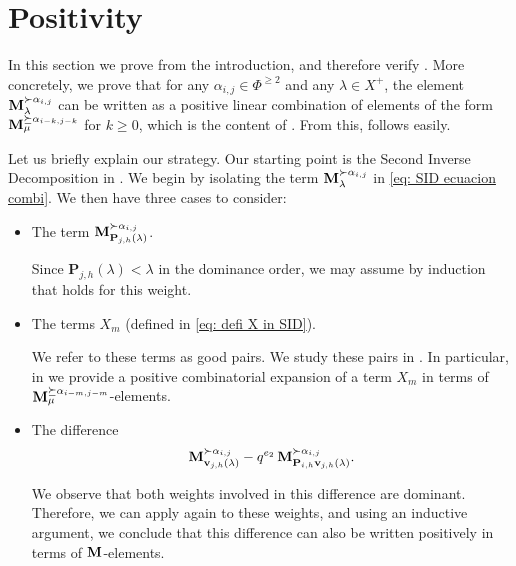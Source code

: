 
\section{Positivity}\label{section: positivity}

In this section we prove  from the introduction, and therefore verify .
More concretely, we prove that for any $\alpha_{i,j}\in \Phi^{\geq 2}$ and any $\lambda \in X^+$, the element $\mathbf{M}_{\lambda }^{\succ \alpha_{i,j}}$ can be written as a positive linear combination of elements of the form $\mathbf{M}_{\mu}^{\succeq \alpha_{i-k,j-k}}$ for $k\geq 0$, which is the content of .
From this,  follows easily.

Let us briefly explain our strategy.
Our starting point is the Second Inverse Decomposition in .
We begin by isolating the term $\mathbf{M}_{\lambda}^{\succ \alpha_{i,j}}$ in \eqref{eq: SID ecuacion combi}.
We then have three cases to consider:
\begin{itemize}
\item The term $\mathbf{M}_{\mathbf{P}_{j,h}(\lambda)}^{\succ \alpha_{i,j}}$.

Since $\mathbf{P}_{j,h}(\lambda)< \lambda$ in the dominance order, we may assume by induction that  holds for this weight.

\item The terms $X_m$ (defined in \eqref{eq: defi X in SID}). 

We refer to these terms as good pairs. 
We study these pairs in .
In particular, in  we provide a positive combinatorial expansion of a term $X_m$ in terms of $\mathbf{M}_{\mu}^{\succeq \alpha_{i-m,j-m}}$-elements. 

\item The difference
\[
\mathbf{M}_{\mathbf{v}_{j,h}(\lambda)}^{\succ \alpha_{i,j}}
      - q^{e_2}\,  \mathbf{M}_{\mathbf{P}_{i,h}\mathbf{v}_{j,h}(\lambda)}^{\succ \alpha_{i,j}}.
\]

We observe that both weights involved in this difference are dominant. Therefore, we can apply  again to these weights, and using an inductive argument, we conclude that this difference can also be written positively in terms of $\mathbf{M}$-elements.      
\end{itemize}




 


